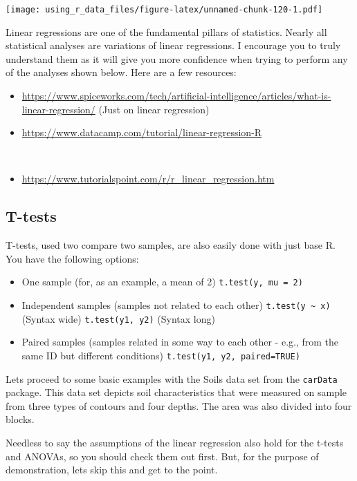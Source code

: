\documentclass[
]{book}
\providecommand{\tightlist}{%
  \setlength{\itemsep}{0pt}\setlength{\parskip}{0pt}}
\begin{document}
\texttt{[image: using\_r\_data\_files/figure-latex/unnamed-chunk-120-1.pdf]}

Linear regressions are one of the fundamental pillars of statistics. Nearly all statistical analyses are variations of linear regressions. I encourage you to truly understand them as it will give you more confidence when trying to perform any of the analyses shown below. Here are a few resources:\\

\begin{itemize}
\tightlist
\item
  \url{https://www.spiceworks.com/tech/artificial-intelligence/articles/what-is-linear-regression/} (Just on linear regression)\\
\item
  \url{https://www.datacamp.com/tutorial/linear-regression-R}\strut \\
\item
  \url{https://www.tutorialspoint.com/r/r_linear_regression.htm}
\end{itemize}

\hypertarget{t-tests}{%
\subsection{T-tests}\label{t-tests}}

T-tests, used two compare two samples, are also easily done with just base R.
You have the following options:

\begin{itemize}
\item
  One sample (for, as an example, a mean of 2)
  \texttt{t.test(y,\ mu\ =\ 2)}
\item
  Independent samples (samples not related to each other)
  \texttt{t.test(y\ \textasciitilde{}\ x)} (Syntax wide)
  \texttt{t.test(y1,\ y2)} (Syntax long)
\item
  Paired samples (samples related in some way to each other - e.g., from the same ID but different conditions)
  \texttt{t.test(y1,\ y2,\ paired=TRUE)}
\end{itemize}

Lets proceed to some basic examples with the Soils data set from the \texttt{carData} package. This data set depicts soil characteristics that were measured on sample from three types of contours and four depths. The area was also divided into four blocks.

Needless to say the assumptions of the linear regression also hold for the t-tests and ANOVAs, so you should check them out first. But, for the purpose of demonstration, lets skip this and get to the point.
\end{document}
